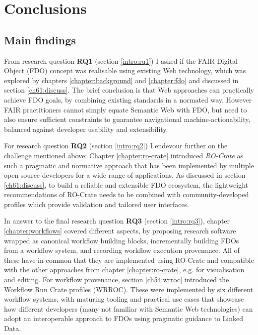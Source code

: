 \section{Conclusions}

\subsection{Main findings}

From research question \textbf{RQ1} (section \vref{intro:rq1}) I asked if the FAIR Digital Object (FDO) concept was realisable using existing Web technology, which was explored by chapters \ref{chapter:background} and \ref{chapter:fdo} and discussed in section \ref{ch61:discuss}. The brief conclusion is that Web approaches can practically achieve FDO goals, by combining existing standards in a normated way. However FAIR practitioners cannot simply equate Semantic Web with FDO, but need to also ensure sufficient constraints to guarantee navigational machine-actionability, balanced against developer usability and extensibility. 

For research question \textbf{RQ2} (section \vref{intro:rq2}) I endevour further on the challenge mentioned above: Chapter \ref{chapter:ro-crate} introduced \emph{RO-Crate} as such a pragmatic and normative approach that has been implemented by multiple open source developers for a wide range of applications. As discussed in section \ref{ch61:discuss}, to build a reliable and extensible FDO ecosystem, the lightweight recommendations of RO-Crate needs to be combined with community-developed profiles which provide validation and tailored user interfaces.

In answer to the final research question \textbf{RQ3} (section \vref{intro:rq3}), chapter \ref{chapter:workflows} covered different aspects, by proposing research software wrapped as canonical workflow building blocks, incrementally building FDOs from a workflow system, and recording workflow execution provenance. All of these have in common that they are implemented using RO-Crate and compatible with the other approaches from chapter \ref{chapter:ro-crate}, e.g. for visualisation and editing. For workflow provenance, section \vref{ch54:wrroc} introduced the Workflow Run Crate profiles (WRROC). These were implemented by six different workflow systems, with maturing tooling and practical use cases that showcase how different developers (many not familiar with Semantic Web technologies) can adopt an interoperable approach to FDOs using pragmatic guidance to Linked Data.


